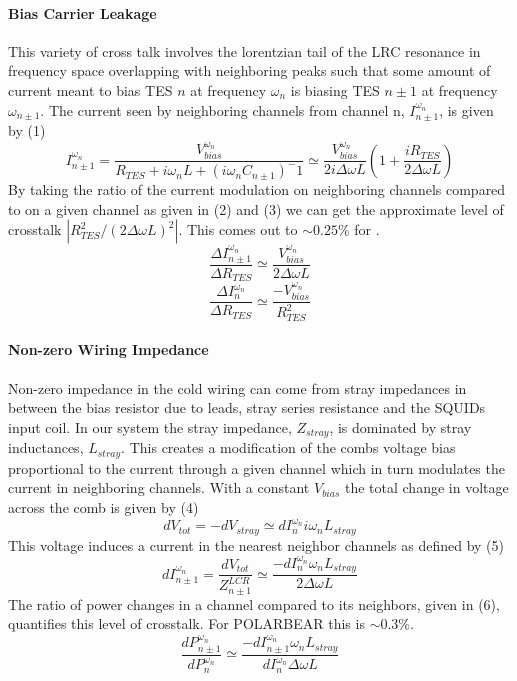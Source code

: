 \setcounter{equation}{0}
\paragraph{Bias Carrier Leakage}
This variety of cross talk involves the lorentzian tail of the LRC resonance in frequency space overlapping with neighboring peaks such that some amount of current meant to bias TES $n$ at frequency $\omega_n$ is biasing TES $n\pm1$ at frequency $\omega_{n\pm1}$. The current seen by neighboring channels from channel n, $I^{\omega_n}_{n\pm1}$, is given by (1)
\begin{equation}
I^{\omega_n}_{n\pm1} = \frac{V^{\omega_n}_{bias}}{R_{TES}+i\omega_nL+(i\omega_nC_{n\pm1})^-1} \simeq \frac{V^{\omega_n}_{bias}}{2i\Delta\omega L}\left(1+\frac{iR_{TES}}{2\Delta\omega L}\right)
\end{equation}
By taking the ratio of the current modulation on neighboring channels compared to on a given channel as given in (2) and (3) we can get  the approximate level of crosstalk $|R^2_{TES}/(2\Delta \omega L)^2|$. This comes out to $\sim0.25\%$ for \pb.
\begin{equation}
\frac{\Delta I^{\omega_n}_{n\pm1}}{\Delta R_{TES}} \simeq \frac{V^{\omega_n}_{bias}}{2\Delta\omega L}
\end{equation}
\begin{equation}
\frac{\Delta I^{\omega_n}_{n}}{\Delta R_{TES}} \simeq \frac{-V^{\omega_n}_{bias}}{R^2_{TES}}
\end{equation}

\paragraph{Non-zero Wiring Impedance}
Non-zero impedance in the cold wiring can come from stray impedances in between the bias resistor due to leads, stray series resistance and the SQUIDs input coil. In our system the stray impedance, $Z_{stray}$, is dominated by stray inductances, $L_{stray}$. This creates a modification of the combs voltage bias proportional to the current through a given channel which in turn modulates the current in neighboring channels. With a constant $V_{bias}$ the total change in voltage across the comb is given by (4)
\begin{equation}
dV_{tot}=-dV_{stray}\simeq dI^{\omega_n}_{n}i\omega_nL_{stray}
\end{equation}
This voltage induces a current in the nearest neighbor channels as defined by (5)
\begin{equation}
dI^{\omega_n}_{n\pm1}=\frac{dV_{tot}}{Z^{LCR}_{n\pm1}}\simeq \frac{-dI^{\omega_n}_{n}\omega_nL_{stray}}{2\Delta \omega L}
\end{equation}
The ratio of power changes in a channel compared to its neighbors, given in (6), quantifies this level of crosstalk. For POLARBEAR this is $\sim0.3\%$.
\begin{equation}
\frac{dP^{\omega_n}_{n\pm1}}{dP^{\omega_n}_{n}}\simeq \frac{-dI^{\omega_n}_{n\pm1}\omega_nL_{stray}}{dI^{\omega_n}_{n}\Delta\omega L}
\end{equation}
